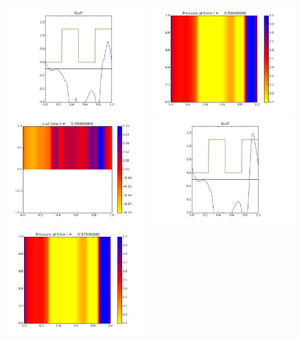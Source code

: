 \documentclass[11pt]{article}
\begin{document}
\vskip 10pt 
\includegraphics[width=0.475\textwidth]{frame0021fig3.png}
\vskip 10pt 
\includegraphics[width=0.475\textwidth]{frame0022fig0.png}
\includegraphics[width=0.475\textwidth]{frame0022fig1.png}
\vskip 10pt 
\includegraphics[width=0.475\textwidth]{frame0022fig3.png}
\vskip 10pt 
\includegraphics[width=0.475\textwidth]{frame0023fig0.png}
\end{document}
